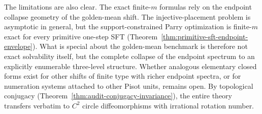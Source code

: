 The limitations are also clear. The exact finite-\(m\) formulas rely on the
endpoint collapse geometry of the golden-mean shift. The injective-placement
problem is asymptotic in general, but the support-constrained Parry
optimization is finite-\(m\) exact for every primitive one-step SFT
(Theorem~\ref{thm:primitive-sft-endpoint-envelope}). What is special about the
golden-mean benchmark is therefore not exact solvability itself, but the
complete collapse of the endpoint spectrum to an explicitly enumerable
three-level structure. Whether analogous elementary closed forms exist for
other shifts of finite type with richer endpoint spectra, or for numeration
systems attached to other Pisot units, remains open. By topological conjugacy
(Theorem~\ref{thm:audit-conjugacy-invariance}), the entire theory transfers
verbatim to \(C^2\) circle diffeomorphisms with irrational rotation number.
